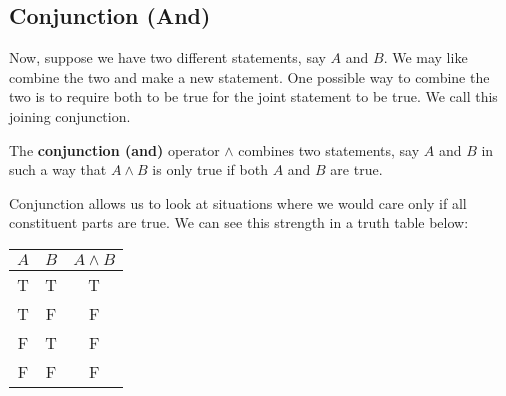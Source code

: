 \subsection{Conjunction (And)}

Now, suppose we have two different statements, say $A$ and $B$.
We may like combine the two and make a new statement.
One possible way to combine the two is to require both to be true for the joint statement to be true.
We call this joining conjunction.

\begin{defn}
\label{defn:conjunction}
  The \textbf{conjunction (and)} operator $\land$ combines two statements, say $A$ and $B$ in such a way that $A\land B$ is only true if both $A$ and $B$ are true. 
\end{defn}

Conjunction allows us to look at situations where we would care only if all constituent parts are true.
We can see this strength in a truth table below:

\begin{minipage}{\linewidth}
  \centering
  \begin{tabular}{ccc}
    $A$ & $B$ & $A \land B$ \\
    \toprule
    T & T & T \\
    T & F & F \\
    F & T & F \\
    F & F & F \\
  \end{tabular}
  \label{tab:conjunction} 
\end{minipage}

